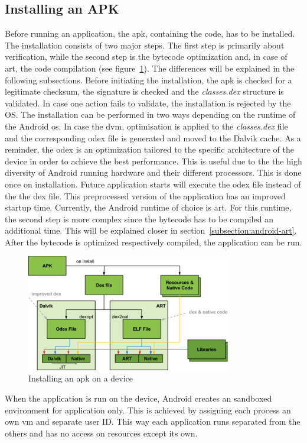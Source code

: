 \subsection{Installing an APK} \label{subsection:android-install}
Before running an application, the \gls{apk}, containing the code, has to be installed.
The installation consists of two major steps.
The first step is primarily about verification, while the second step is the bytecode optimization and, in case of \gls{art}, the code compilation (see figure~\ref{fig:install}).
The differences will be explained in the following subsections.
\newline
Before initiating the installation, the \gls{apk} is checked for a legitimate checksum, the signature is checked and the \textit{classes.dex} structure is validated.
In case one action fails to validate, the installation is rejected by the OS.
\newline
The installation can be performed in two ways depending on the runtime of the Android \gls{os}.
In case the \gls{dvm}, optimisation is applied to the \textit{classes.dex} file and the corresponding \gls{odex} file is generated and moved to the Dalvik cache.
As a reminder, the \gls{odex} is an optimization tailored to the specific architecture of the device in order to achieve the best performance.
This is useful due to the the high diversity of Android running hardware and their different processors.
This is done once on installation.
Future application starts will execute the \gls{odex} file instead of the the \gls{dex} file.
This preprocessed version of the application has an improved startup time. \cite{kovachevaMaster}
\newline
Currently, the Android runtime of choice is \gls{art}.
For this runtime, the second step is more complex since the bytecode has to be compiled an additional time.
This will be explained closer in section~\ref{subsection:android-art}.
\newline
After the bytecode is optimized respectively compiled, the application can be run.
\newline
\begin{figure}[h]
    \centering
    \includegraphics[width=0.8\textwidth]{data/install.png}
    \caption{Installing an \gls{apk} on a device \cite{googleIOArt}}
    \label{fig:install}
\end{figure}
When the application is run on the device, Android creates an sandboxed environment for application only.
This is achieved by assigning each process an own \gls{vm} and separate user ID.
This way each application runs separated from the others and has no access on resources except its own. \cite{developerFundamentals}
